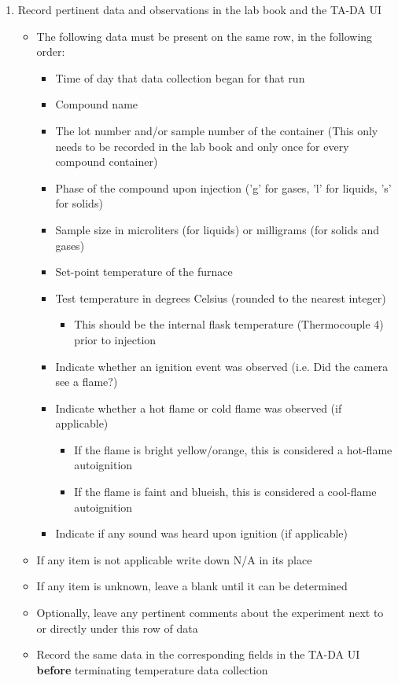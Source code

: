 \documentclass[letterpaper,11pt]{article}
\begin{document}
\begin{enumerate}
    \item Record pertinent data and observations in the lab book and the 
        TA-DA UI
        \begin{itemize}
        \item The following data must be present on the same row, in the 
            following order:
            \begin{itemize}
            \item Time of day that data collection began for that run
            \item Compound name 
            \item The lot number and/or sample number of the 
                container (This only needs to be recorded in the lab book  and 
                only once for every compound container)
            \item Phase of the compound upon injection ('g' for gases, 'l' for 
                liquids, 's' for solids)
            \item Sample size in microliters (for liquids) or milligrams
                (for solids and gases)
            \item Set-point temperature of the furnace
            \item Test temperature in degrees Celsius (rounded to the 
                nearest integer)
                \begin{itemize}
                \item This should be the internal flask temperature 
                    (Thermocouple 4) prior to injection
                \end{itemize}
            \item Indicate whether an ignition event was observed (i.e. Did 
                the camera see a flame?)
            \item Indicate whether a hot flame or cold flame was observed (if 
                applicable)
                \begin{itemize}
                \item If the flame is bright yellow/orange, this is considered a 
                    hot-flame autoignition
                \item If the flame is faint and blueish, this is considered a 
                    cool-flame autoignition
                \end{itemize}
            \item Indicate if any sound was heard upon ignition (if applicable)
            \end{itemize}
        \item If any item is not applicable write down N/A in its place
        \item If any item is unknown, leave a blank until it can be determined
        \item Optionally, leave any pertinent comments about the experiment
            next to or directly under this row of data
        \item Record the same data in the corresponding fields in the TA-DA UI
            \textbf{before} terminating temperature data collection
        \end{itemize}
        

\end{enumerate}
\end{document}
